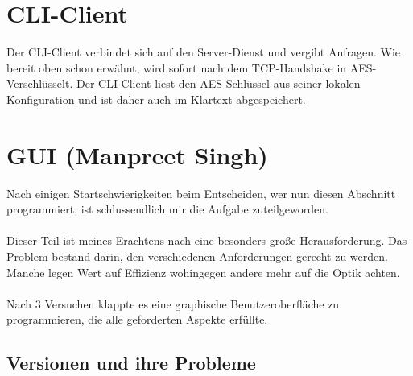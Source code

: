 \documentclass[12pt,a4paper]{report}
\begin{document}
\begin{onehalfspace}
\section{CLI-Client}

Der CLI-Client verbindet sich auf den Server-Dienst und vergibt Anfragen. Wie bereit oben schon erwähnt, wird sofort nach dem TCP-Handshake in AES-Verschlüsselt. Der CLI-Client liest den AES-Schlüssel aus seiner lokalen Konfiguration und ist daher auch im Klartext abgespeichert.

\newpage
\section{GUI (Manpreet Singh)}
Nach einigen Startschwierigkeiten beim Entscheiden, wer nun diesen Abschnitt programmiert, ist schlussendlich mir die Aufgabe zuteilgeworden.\\\\
Dieser Teil ist meines Erachtens nach eine besonders große Herausforderung. Das Problem bestand darin, den verschiedenen Anforderungen gerecht zu werden. Manche legen Wert auf Effizienz wohingegen andere mehr auf die Optik achten.\\\\
Nach 3 Versuchen klappte es eine graphische Benutzeroberfläche zu programmieren, die alle geforderten Aspekte erfüllte.\\

\subsection{Versionen und ihre Probleme}

\end{onehalfspace}
\end{document}
